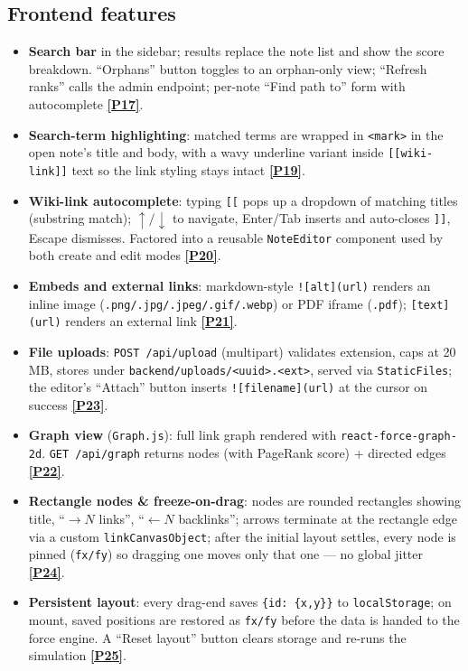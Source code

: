 \documentclass[11pt,a4paper]{article}
\newcommand{\prm}[1]{\href{PROMPT_LOG.md}{\textbf{[P#1]}}}
\begin{document}
\subsection{Frontend features}
\begin{itemize}[leftmargin=1.2em,itemsep=1pt,topsep=2pt]
\item \textbf{Search bar} in the sidebar; results replace the note list and show the score breakdown. ``Orphans'' button toggles to an orphan-only view; ``Refresh ranks'' calls the admin endpoint; per-note ``Find path to'' form with autocomplete \prm{17}.
\item \textbf{Search-term highlighting}: matched terms are wrapped in \texttt{<mark>} in the open note's title and body, with a wavy underline variant inside \texttt{[[wiki-link]]} text so the link styling stays intact \prm{19}.
\item \textbf{Wiki-link autocomplete}: typing \texttt{[[} pops up a dropdown of matching titles (substring match); $\uparrow/\downarrow$ to navigate, Enter/Tab inserts and auto-closes \texttt{]]}, Escape dismisses. Factored into a reusable \texttt{NoteEditor} component used by both create and edit modes \prm{20}.
\item \textbf{Embeds and external links}: markdown-style \texttt{![alt](url)} renders an inline image (\texttt{.png/.jpg/.jpeg/.gif/.webp}) or PDF iframe (\texttt{.pdf}); \texttt{[text](url)} renders an external link \prm{21}.
\item \textbf{File uploads}: \texttt{POST /api/upload} (multipart) validates extension, caps at 20\,MB, stores under \texttt{backend/uploads/<uuid>.<ext>}, served via \texttt{StaticFiles}; the editor's ``Attach'' button inserts \texttt{![filename](url)} at the cursor on success \prm{23}.
\item \textbf{Graph view} (\texttt{Graph.js}): full link graph rendered with \texttt{react-force-graph-2d}. \texttt{GET /api/graph} returns nodes (with PageRank score) + directed edges \prm{22}.
\item \textbf{Rectangle nodes \& freeze-on-drag}: nodes are rounded rectangles showing title, ``$\to N$ links'', ``$\leftarrow N$ backlinks''; arrows terminate at the rectangle edge via a custom \texttt{linkCanvasObject}; after the initial layout settles, every node is pinned (\texttt{fx/fy}) so dragging one moves only that one --- no global jitter \prm{24}.
\item \textbf{Persistent layout}: every drag-end saves \texttt{\{id: \{x,y\}\}} to \texttt{localStorage}; on mount, saved positions are restored as \texttt{fx/fy} before the data is handed to the force engine. A ``Reset layout'' button clears storage and re-runs the simulation \prm{25}.
\end{itemize}
\end{document}
